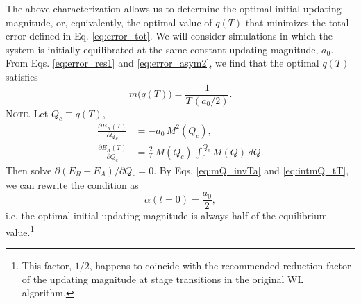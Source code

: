 \documentclass[reprint, superscriptaddress, floatfix]{revtex4-1}
\newcommand{\note}[1]{{\color{DarkGreen}\footnotesize \textsc{Note.} #1}}
\newcommand{\Err}{E}
\begin{document}
The above characterization allows us to determine
the optimal initial updating magnitude,
or, equivalently, the optimal value of $q(T)$
that minimizes the total error defined in Eq. \eqref{eq:error_tot}.
%
We will consider simulations in which
the system is initially equilibrated at the same
constant updating magnitude, $a_0$.
%
From Eqs. \eqref{eq:error_res1}
and \eqref{eq:error_asym2},
we find that
the optimal $q(T)$ satisfies
\begin{equation}
  m\bigl( q(T) \bigr)
  =
  \frac{1} { T \, (a_0 / 2) }
  .
\label{eq:opt_qT}
\end{equation}
%
\note{Let $Q_c \equiv q(T)$,
$$
\begin{aligned}
  \frac{
    \partial \Err_R(T)
  }
  {
    \partial Q_c
  }
  &=
  -a_0 \, M^2(Q_c)
  ,
  \\
  \frac{
    \partial \Err_A(T)
  }
  {
    \partial Q_c
  }
  &=
  \frac 2 T \,
  M(Q_c) \,
  \int_0^{ Q_c } M(Q) \, dQ
  .
\end{aligned}
$$
Then solve $\partial (\Err_R + \Err_A) / \partial Q_c = 0$.
}%
By Eqs. \eqref{eq:mQ_invTa} and \eqref{eq:intmQ_tT},
we can rewrite the condition as
\begin{equation}
  \alpha( t = 0 )
  =
  \frac{ a_0 }
       { 2 }
  ,
\label{eq:half_alpha0}
\end{equation}
%
i.e. the optimal initial updating magnitude
is always half of the equilibrium value.\footnote{This factor, $1/2$,
happens to coincide with the
recommended reduction factor of the updating magnitude
at stage transitions
in the original WL algorithm\cite{
wang2001, *wang2001pre}.
}


%
\end{document}
